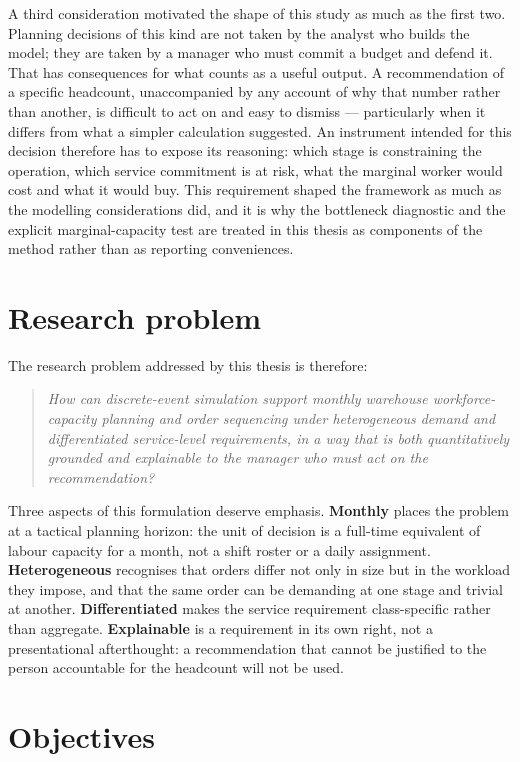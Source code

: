 A third consideration motivated the shape of this study as much as the first two. Planning
decisions of this kind are not taken by the analyst who builds the model; they are taken by a
manager who must commit a budget and defend it. That has consequences for what counts as a
useful output. A recommendation of a specific headcount, unaccompanied by any account of why
that number rather than another, is difficult to act on and easy to dismiss --- particularly
when it differs from what a simpler calculation suggested. An instrument intended for this
decision therefore has to expose its reasoning: which stage is constraining the operation, which
service commitment is at risk, what the marginal worker would cost and what it would buy. This
requirement shaped the framework as much as the modelling considerations did, and it is why the
bottleneck diagnostic and the explicit marginal-capacity test are treated in this thesis as
components of the method rather than as reporting conveniences.

\section{Research problem}
\label{sec:research-problem}

The research problem addressed by this thesis is therefore:

\begin{quote}
\emph{How can discrete-event simulation support monthly warehouse workforce-capacity planning
and order sequencing under heterogeneous demand and differentiated service-level requirements,
in a way that is both quantitatively grounded and explainable to the manager who must act on
the recommendation?}
\end{quote}

Three aspects of this formulation deserve emphasis. \textbf{Monthly} places the problem at a
tactical planning horizon: the unit of decision is a full-time equivalent of labour capacity
for a month, not a shift roster or a daily assignment. \textbf{Heterogeneous} recognises that
orders differ not only in size but in the workload they impose, and that the same order can be
demanding at one stage and trivial at another. \textbf{Differentiated} makes the service
requirement class-specific rather than aggregate. \textbf{Explainable} is a requirement in its
own right, not a presentational afterthought: a recommendation that cannot be justified to the
person accountable for the headcount will not be used.

\section{Objectives}
\label{sec:objectives}

